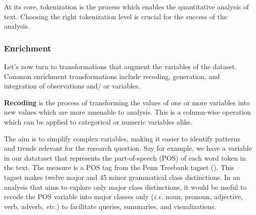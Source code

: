 \documentclass[
  letterpaper,
]{latex/krantz}
\theoremstyle{definition}
\theoremstyle{remark}
\begin{document}
\begin{table}
\begin{minipage}{0.33\linewidth}


\end{minipage}%

\end{table}%

At its core, tokenization is the process which enables the quantitative
analysis of text. Choosing the right tokenization level is crucial for
the success of the analysis.

\subsubsection{Enrichment}\label{enrichment}

Let's now turn to transformations that augment the variables of the
dataset. Common enrichment transformations include recoding, generation,
and integration of observations and/ or variables.

\textbf{Recoding} is the process of transforming the values of one or
more variables into new values which are more amenable to analysis. This
is a column-wise operation which can be applied to categorical or
numeric variables alike.

The aim is to simplify complex variables, making it easier to identify
patterns and trends relevant for the research question. Say for example,
we have a variable in our datataset that represents the part-of-speech
(POS) of each word token in the text. The measure is a POS tag from the
Penn Treebank tagset (). This tagset makes twelve major and 45 minor
grammatical class distinctions. In an analysis that aims to explore only
major class distinctions, it would be useful to recode the POS variable
into major classes only (\emph{i.e.} noun, pronoun, adjective, verb,
adverb, \emph{etc.}) to facilitate queries, summaries, and
visualizations.
\end{document}

